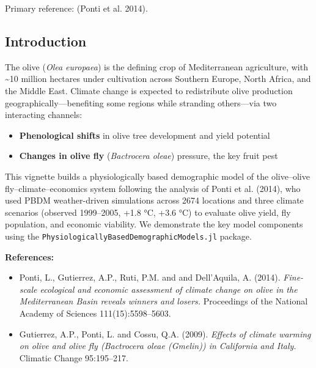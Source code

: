 Primary reference: (Ponti et al. 2014).



\subsection{Introduction}



\label{16879307210612674453}{}


The olive (\emph{Olea europaea}) is the defining crop of Mediterranean agriculture, with {\textasciitilde}10 million hectares under cultivation across Southern Europe, North Africa, and the Middle East. Climate change is expected to redistribute olive production geographically—benefiting some regions while stranding others—via two interacting channels:



\begin{itemize}
\item[1. ] \textbf{Phenological shifts} in olive tree development and yield  potential


\item[2. ] \textbf{Changes in olive fly} (\emph{Bactrocera oleae}) pressure, the key  fruit pest

\end{itemize}


This vignette builds a physiologically based demographic model of the olive–olive fly–climate–economics system following the analysis of Ponti et al. (2014), who used PBDM weather-driven simulations across 2674 locations and three climate scenarios (observed 1999–2005, +1.8 °C, +3.6 °C) to evaluate olive yield, fly population, and economic viability. We demonstrate the key model components using the \texttt{PhysiologicallyBasedDemographicModels.jl} package.



\textbf{References:}



\begin{itemize}
\item Ponti, L., Gutierrez, A.P., Ruti, P.M. and and Dell’Aquila, A. (2014). \emph{Fine-scale ecological and economic assessment of climate change on olive in the Mediterranean Basin reveals winners and losers.} Proceedings of the National Academy of Sciences 111(15):5598–5603.


\item Gutierrez, A.P., Ponti, L. and Cossu, Q.A. (2009). \emph{Effects of climate warming on olive and olive fly (Bactrocera oleae (Gmelin)) in California and Italy.} Climatic Change 95:195–217.

\end{itemize}


